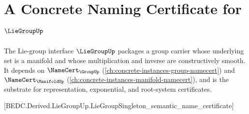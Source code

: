 \chapter{A Concrete Naming Certificate for $\LieGroupUp$}
\label{ch:concrete-instances-liegroup-namecert}

The Lie-group interface $\LieGroupUp$ packages a group carrier whose underlying set is a manifold and whose multiplication and inverse are constructively smooth. It depends on $\NameCert_{\GroupUp}$ (\autoref{ch:concrete-instances-group-namecert}) and $\NameCert_{\ManifoldUp}$ (\autoref{ch:concrete-instances-manifold-namecert}), and is the substrate for representation, exponential, and root-system certificates.





[BEDC.Derived.LieGroupUp.LieGroupSingleton\_semantic\_name\_certificate]

